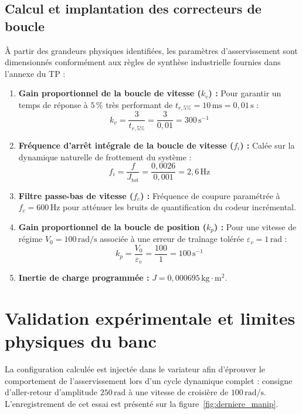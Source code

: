 \documentclass[12pt,a4paper]{article}
\begin{document}
\subsection{Calcul et implantation des correcteurs de boucle}

À partir des grandeurs physiques identifiées, les paramètres d'asservissement sont dimensionnés conformément aux règles de synthèse industrielle fournies dans l'annexe du TP :

\begin{enumerate}
    \item \textbf{Gain proportionnel de la boucle de vitesse ($k_v$) :}
    Pour garantir un temps de réponse à $5\,\%$ très performant de $t_{r,5\%} = 10\,\text{ms} = 0{,}01\,\text{s}$ :
    \begin{equation}
    k_v = \frac{3}{t_{r,5\%}} = \frac{3}{0{,}01} = 300\,\text{s}^{-1}
    \end{equation}
    \item \textbf{Fréquence d'arrêt intégrale de la boucle de vitesse ($f_i$) :}
    Calée sur la dynamique naturelle de frottement du système :
    \begin{equation}
    f_i = \frac{f}{J_{\text{tot}}} = \frac{0{,}0026}{0{,}001} = 2{,}6\,\text{Hz}
    \end{equation}
    \item \textbf{Filtre passe-bas de vitesse ($f_c$) :}
    Fréquence de coupure paramétrée à $f_c = 600\,\text{Hz}$ pour atténuer les bruits de quantification du codeur incrémental.
    \item \textbf{Gain proportionnel de la boucle de position ($k_p$) :}
    Pour une vitesse de régime $V_0 = 100\,\text{rad/s}$ associée à une erreur de traînage tolérée $\varepsilon_v = 1\,\text{rad}$ :
    \begin{equation}
    k_p = \frac{V_0}{\varepsilon_v} = \frac{100}{1} = 100\,\text{s}^{-1}
    \end{equation}
    \item \textbf{Inertie de charge programmée :} $J = 0{,}000695\,\text{kg}\cdot\text{m}^2$.
\end{enumerate}

\section{Validation expérimentale et limites physiques du banc}

La configuration calculée est injectée dans le variateur afin d'éprouver le comportement de l'asservissement lors d'un cycle dynamique complet : consigne d'aller-retour d'amplitude $250\,\text{rad}$ à une vitesse de croisière de $100\,\text{rad/s}$. L'enregistrement de cet essai est présenté sur la figure~\ref{fig:derniere_manip}.
\end{document}
